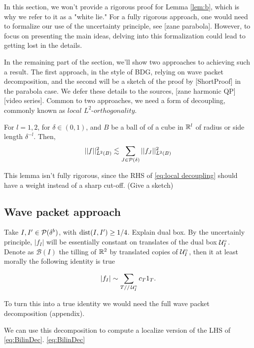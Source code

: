 In this section, we won’t provide a rigorous proof for Lemma \ref{lem:b}, which is why we refer to it as a "white lie." For a fully rigorous approach, one would need to formalize our use of the uncertainty principle, see [zane parabola]. However, to focus on presenting the main ideas, delving into this formalization could lead to getting lost in the details.

In the remaining part of the section, we'll show two approaches to achieving such a result. The first approach, in the style of BDG, relying on wave packet decomposition, and the second will be a sketch of the proof by [ShortProof] in the parabola case. We defer these details to the sources, [zane harmonic QP] [video series].
\newline
Common to two approaches, we need a form of decoupling, commonly known as $local$ $L^2$-$orthogonality$.
\begin{lem}\label{white lie2}
    For $l=1,2$, for $\delta \in (0,1)$, and $B$ be a ball of of a cube in $\mathbb{R}^l$ of radius or side length $\delta^{-l}$. Then,
    \begin{equation}\label{eq:local decoupling}
    || f||_{L^{2}(B)}^{2} \lesssim \sum_{J\in\mathcal{P}(\delta)} || f_{J}||_{L^{2}(B)} ^{2}
    \end{equation}
\end{lem}
This lemma isn't fully rigorous, since the RHS of \ref{eq:local decoupling} should have a weight instead of a sharp cut-off. (Give a sketch)




\subsection{Wave packet approach}\label{subsection:Wave packet approach}
Take $I,I'  \in \mathcal{P}(\delta^b)$, with $\text{dist}(I, I') \ge 1/4$. Explain dual box. By the uncertainly principle, $|f_{I}|$ will be essentially constant on translates of the dual box $\mathcal{U}^\circ_{I}$. Denote as $\mathcal{B}(I)$ the tilling of $\mathbb{R}^2$ by translated copies of $\mathcal{U}^\circ_{I}$, then it at least morally the following identity is true


\begin{equation}\label{eq: heuristic wave packet}
    |f_{I}| \sim \sum_{T // \, \mathcal{U}^\circ_{I}} c_{T} 1_{T}.
\end{equation}

To turn this into a true identity we would need the full wave packet decomposition (appendix). 

We can use this decomposition to compute a localize version of the LHS of \ref{eq:BilinDec}. \ref{eq:BilinDec}

